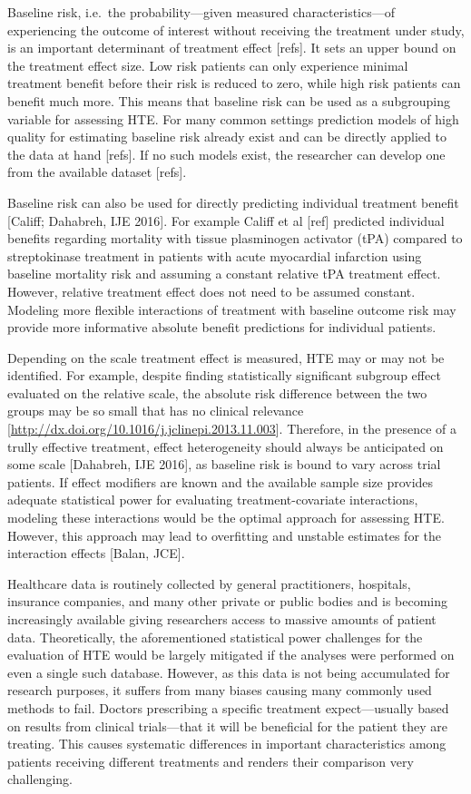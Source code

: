 \documentclass[
]{book}
\begin{document}
Baseline risk, i.e.~the probability---given measured characteristics---of
experiencing the outcome of interest without receiving the treatment under
study, is an important determinant of treatment effect {[}refs{]}. It sets an upper
bound on the treatment effect size. Low risk patients can only experience
minimal treatment benefit before their risk is reduced to zero, while high risk
patients can benefit much more. This means that baseline risk can be used as a
subgrouping variable for assessing HTE. For many common settings prediction
models of high quality for estimating baseline risk already exist and can be
directly applied to the data at hand {[}refs{]}. If no such models exist, the
researcher can develop one from the available dataset {[}refs{]}.

Baseline risk can also be used for directly predicting individual treatment
benefit {[}Califf; Dahabreh, IJE 2016{]}. For example Califf et al {[}ref{]} predicted
individual benefits regarding mortality with tissue plasminogen activator (tPA)
compared to streptokinase treatment in patients with acute myocardial infarction
using baseline mortality risk and assuming a constant relative tPA treatment
effect. However, relative treatment effect does not need to be assumed
constant. Modeling more flexible interactions of treatment with baseline outcome
risk may provide more informative absolute benefit predictions for individual
patients.

Depending on the scale treatment effect is measured, HTE may or may not be
identified. For example, despite finding statistically significant subgroup
effect evaluated on the relative scale, the absolute risk difference between the
two groups may be so small that has no clinical relevance
{[}\url{http://dx.doi.org/10.1016/j.jclinepi.2013.11.003}{]}. Therefore, in the presence
of a trully effective treatment, effect heterogeneity should always be
anticipated on some scale {[}Dahabreh, IJE 2016{]}, as baseline risk is bound to
vary across trial patients. If effect modifiers are known and the available
sample size provides adequate statistical power for evaluating
treatment-covariate interactions, modeling these interactions would be the
optimal approach for assessing HTE. However, this approach may lead to
overfitting and unstable estimates for the interaction effects {[}Balan, JCE{]}.

Healthcare data is routinely collected by general practitioners, hospitals,
insurance companies, and many other private or public bodies and is becoming
increasingly available giving researchers access to massive amounts of patient
data. Theoretically, the aforementioned statistical power challenges for the
evaluation of HTE would be largely mitigated if the analyses were performed on
even a single such database. However, as this data is not being accumulated for
research purposes, it suffers from many biases causing many commonly used
methods to fail. Doctors prescribing a specific treatment expect---usually
based on results from clinical trials---that it will be beneficial for the
patient they are treating. This causes systematic differences in important
characteristics among patients receiving different treatments and renders their
comparison very challenging.
\end{document}
